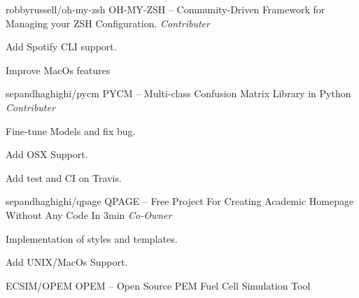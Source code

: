 


\begin{cventries}
  \cventry
    {robbyrussell/oh-my-zsh} %
    {OH-MY-ZSH -- Community-Driven Framework for Managing your ZSH Configuration.} %
    {\textit{Contributer}} %
    {} %
    {
      \begin{cvitems} %
        \item {Add Spotify CLI support.}
        \item {Improve MacOs features}
      \end{cvitems}
    }
        \newline
  \cventry
    {sepandhaghighi/pycm} %
    {PYCM -- Multi-class Confusion Matrix Library in Python} %
    {\textit{Contributer}} %
    {} %
    {
      \begin{cvitems} %
        \item {Fine-tune Models and fix bug.}
        \item {Add OSX Support.}
        \item {Add test and CI on Travis.}
      \end{cvitems}
    }
        \newline
  \cventry
    {sepandhaghighi/qpage} %
    {QPAGE -- Free Project For Creating Academic Homepage Without Any Code In 3min} %
    {\textit{Co-Owner}} %
    {} %
    {
      \begin{cvitems} %
        \item {Implementation of styles and templates.}
        \item {Add UNIX/MacOs Support.}
      \end{cvitems}
    }
        \newline
  \cventry
    {ECSIM/OPEM} %
    {OPEM -- Open Source PEM Fuel Cell Simulation Tool} %

\end{cventries}
